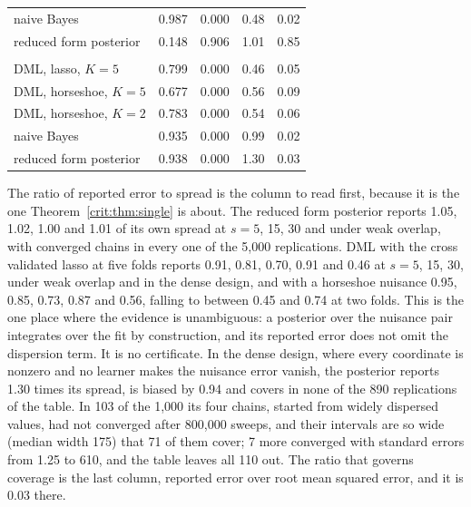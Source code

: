 \begin{table}[ht]
\begin{tabular}{@{}lrrrr@{}}
naive Bayes & 0.987 & 0.000 & 0.48 & 0.02 \\
reduced form posterior & 0.148 & 0.906 & 1.01 & 0.85 \\
\addlinespace
\multicolumn{5}{@{}l}{\textit{dense confounding}} \\
DML, lasso, $K = 5$ & 0.799 & 0.000 & 0.46 & 0.05 \\
DML, horseshoe, $K = 5$ & 0.677 & 0.000 & 0.56 & 0.09 \\
DML, horseshoe, $K = 2$ & 0.783 & 0.000 & 0.54 & 0.06 \\
naive Bayes & 0.935 & 0.000 & 0.99 & 0.02 \\
reduced form posterior & 0.938 & 0.000 & 1.30 & 0.03 \\
\bottomrule
\end{tabular}
\end{table}

The ratio of reported error to spread is the column to read first, because it is the one Theorem~\ref{crit:thm:single} is about. The reduced form posterior reports 1.05, 1.02, 1.00 and 1.01 of its own spread at $s = 5$, 15, 30 and under weak overlap, with converged chains in every one of the 5,000 replications. DML with the cross validated lasso at five folds reports 0.91, 0.81, 0.70, 0.91 and 0.46 at $s = 5$, 15, 30, under weak overlap and in the dense design, and with a horseshoe nuisance 0.95, 0.85, 0.73, 0.87 and 0.56, falling to between 0.45 and 0.74 at two folds. This is the one place where the evidence is unambiguous: a posterior over the nuisance pair integrates over the fit by construction, and its reported error does not omit the dispersion term. It is no certificate. In the dense design, where every coordinate is nonzero and no learner makes the nuisance error vanish, the posterior reports 1.30 times its spread, is biased by 0.94 and covers in none of the 890 replications of the table. In 103 of the 1,000 its four chains, started from widely dispersed values, had not converged after 800,000 sweeps, and their intervals are so wide (median width 175) that 71 of them cover; 7 more converged with standard errors from 1.25 to 610, and the table leaves all 110 out. The ratio that governs coverage is the last column, reported error over root mean squared error, and it is 0.03 there.

